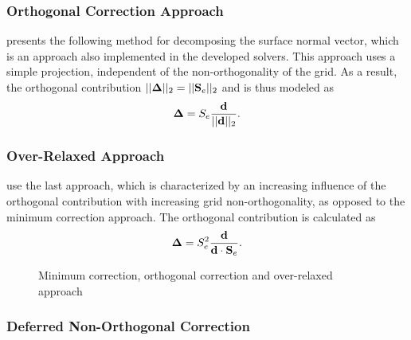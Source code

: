 \subsubsection{Orthogonal Correction Approach}
\label{seq:orthcorrapproach}

\cite{ferziger02} presents the following method for decomposing the surface normal vector, which is an approach also implemented in the developed solvers. This approach uses a simple projection, independent of the non-orthogonality of the grid. As a result, the orthogonal contribution \(||\boldsymbol{\Delta}||_2 =  ||\mathbf{S}_e||_2\) and is thus modeled as 
\begin{displaymath}
  \boldsymbol{\Delta} =  S_e \frac{\mathbf{d}}{ ||\mathbf{d}||_2}.
\end{displaymath}

\subsubsection{Over-Relaxed Approach}

\cite{jasak96,darwish09} use the last approach, which is characterized by an increasing influence of the orthogonal contribution with increasing grid non-orthogonality, as opposed to the minimum correction approach. The orthogonal contribution is calculated as
\begin{displaymath}
  \boldsymbol{\Delta} =  S_e^2 \frac{\mathbf{d}}{ \mathbf{d} \cdot \mathbf{S}_e }.
\end{displaymath} 

\begin{figure}[h]
\label{fig:nonorth}
\hfil
{}
\hfil
{}
\caption{Minimum correction, orthogonal correction and over-relaxed approach}
\end{figure}

\subsubsection{Deferred Non-Orthogonal Correction}

